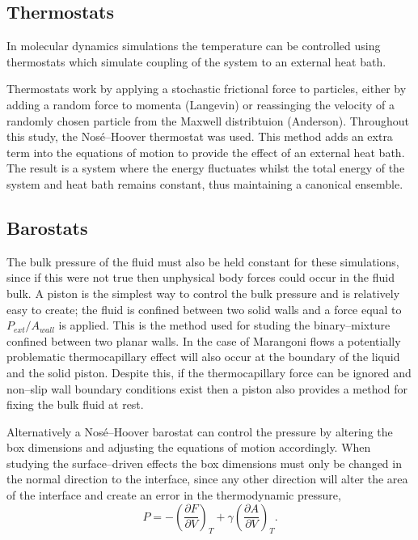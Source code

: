 \subsection{Thermostats}
In molecular dynamics simulations the temperature can be controlled using thermostats which simulate coupling of the system to an external heat bath.

Thermostats work by applying a stochastic frictional force to particles, either by adding a random force to momenta (Langevin)\cite{Langevin} or reassinging the velocity of a randomly chosen particle from the Maxwell distribtuion (Anderson)\cite{AndersonTherm}.
Throughout this study, the Nos\'{e}--Hoover thermostat was used.
This method adds an extra term into the equations of motion to provide the effect of an external heat bath.\cite{NoseHoover1, NoseHoover2, NoseHoover3}
The result is a system where the energy fluctuates whilst the total energy of the system and heat bath remains constant, thus maintaining a canonical ensemble.

\subsection{Barostats}
The bulk pressure of the fluid must also be held constant for these simulations, since if this were not true then unphysical body forces could occur in the fluid bulk.
A piston is the simplest way to control the bulk pressure and is relatively easy to create; the fluid is confined between two solid walls and a force equal to $P_{ext} / A_{wall}$ is applied.
This is the method used for studing the binary--mixture confined between two planar walls.
In the case of Marangoni flows a potentially problematic thermocapillary effect will also occur at the boundary of the liquid and the solid piston.
Despite this, if the thermocapillary force can be ignored and non--slip wall boundary conditions exist then a piston also provides a method for fixing the bulk fluid at rest.

Alternatively a Nos\'{e}--Hoover barostat can control the pressure by altering the box dimensions and adjusting the equations of motion accordingly. \cite{NoseHoover1, NoseHoover2, NoseHoover3}
When studying the surface--driven effects the box dimensions must only be changed in the normal direction to the interface, since any other direction will alter the area of the interface and create an error in the thermodynamic pressure,
\begin{equation}
P = - \left( \frac{\partial F}{\partial V} \right)_{T} + \gamma \left( \frac{\partial A}{\partial V} \right)_{T}.
\end{equation}

